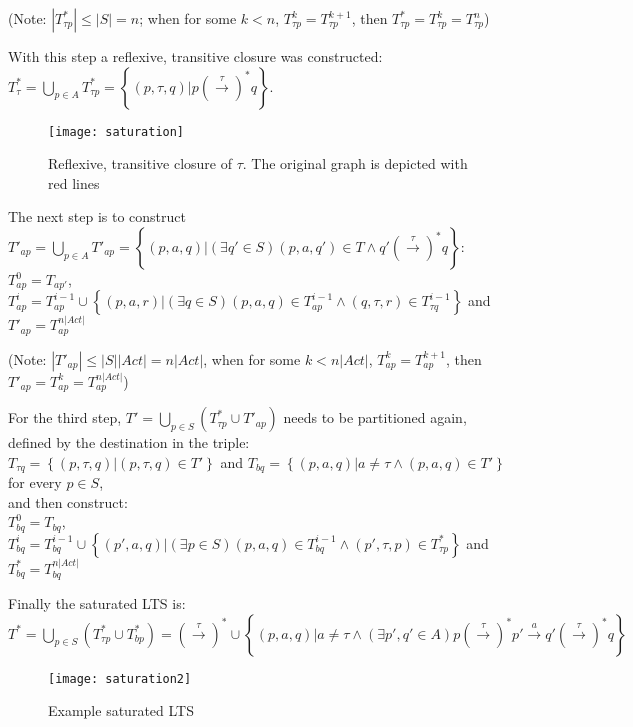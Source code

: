 (Note: ${\left|T^{*}_{\tau p}\right|\leq\left|S\right|=n}$; when for some ${k<n}$, ${T^{k}_{\tau p}=T^{k+1}_{\tau p}}$, then ${T^{*}_{\tau p}=T^{k}_{\tau p}=T^{n}_{\tau p}}$)

With this step a reflexive, transitive closure was constructed: ${T^{*}_{\tau}=\bigcup_{p\in A}T^{*}_{\tau p}=\left\{\left(p,\tau,q\right)|p\left(\stackrel{\tau}{\rightarrow}\right)^{*}q\right\}}$.

\begin{figure}[!ht]
\centering
\texttt{[image: saturation]}
\caption{Reflexive, transitive closure of $\tau$. The original graph is depicted with red lines}
\label{fig:saturation}
\end{figure}

The next step is to construct $T'_{ap}=\bigcup_{p\in A}T'_{ap}=\left\{\left(p,a,q\right)|\left(\exists q'\in S\right)\left(p,a,q'\right)\in T\wedge q'\left(\stackrel{\tau}{\rightarrow}\right)^{*}q\right\}$:\\
$T^{0}_{ap}=T_{ap'}$,\\
$T^{i}_{ap}=T^{i-1}_{ap}\cup \left\{\left(p,a,r\right)|\left(\exists q\in S\right)\left(p,a,q\right)\in T^{i-1}_{ap}\wedge \left(q,\tau,r\right)\in T^{i-1}_{\tau q}\right\}$ and \\
$T'_{ap}=T^{n|Act|}_{ap}$

(Note: $|T'_{ap}|\leq |S||Act|=n|Act|$, when for some $k<n|Act|$, $T^{k}_{ap}=T^{k+1}_{ap}$, then $T'_{ap}=T^{k}_{ap}=T^{n|Act|}_{ap}$)

For the third step, $T'=\bigcup_{p\in S}\left(T^{*}_{\tau p}\cup T'_{ap}\right)$ needs to be partitioned again, defined by the destination in the triple:\\
$T_{\tau q}=\left\{\left(p,\tau,q\right)|\left(p,\tau,q\right)\in T'\right\}$ and $T_{bq}=\left\{\left(p,a,q\right)|a\neq\tau\wedge\left(p,a,q\right)\in T'\right\}$ for every $p\in S$,\\
and then construct:\\
$T^{0}_{bq}=T_{bq}$,\\
$T^{i}_{bq}=T^{i-1}_{bq}\cup\left\{\left(p',a,q\right)|\left(\exists p\in S\right)\left(p,a,q\right)\in T^{i-1}_{bq}\wedge\left(p',\tau,p\right)\in T^{*}_{\tau p}\right\}$ and\\
$T^{*}_{bq}=T^{n|Act|}_{bq}$

Finally the saturated LTS is:\\
$T^{*}=\bigcup_{p\in S}\left(T^{*}_{\tau p}\cup T^{*}_{bp}\right)=\left(\stackrel{\tau}{\rightarrow}\right)^{*}\cup\left\{\left(p,a,q\right)|a\neq\tau\wedge\left(\exists p',q'\in A\right) p\left(\stackrel{\tau}{\rightarrow}\right)^{*}p'\stackrel{a}{\rightarrow}q'\left(\stackrel{\tau}{\rightarrow}\right)^{*}q\right\}$

\begin{figure}[!ht]
\centering
\texttt{[image: saturation2]}
\caption{Example saturated LTS}
\label{fig:saturation2}
\end{figure}

    
    

